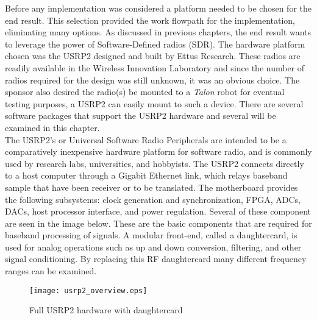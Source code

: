 Before any implementation was considered a platform needed to be chosen for the end result.  This selection provided the work flowpath for the implementation, eliminating many options.  As discussed in previous chapters, the end result wants to leverage the power of Software-Defined radios (SDR).  The hardware platform chosen was the USRP2 designed and built by Ettus Research\cite{USRP2Stats}.  These radios are readily available in the Wireless Innovation Laboratory and since the number of radios required for the design was still unknown, it was an obvious choice.  The sponsor also desired the radio(s) be mounted to a \textit{Talon} robot for eventual testing purposes, a USRP2 can easily mount to such a device.  There are several software packages that support the USRP2 hardware and several will be examined in this chapter.\\

The USRP2's or Universal Software Radio Peripherals are intended to be a comparatively inexpensive hardware platform for software radio, and is commonly used by research labs, universities, and hobbyists\cite{wired}.  The USRP2 connects directly to a host computer through a Gigabit Ethernet link, which relays baseband sample that have been receiver or to be translated.   The motherboard provides the following subsystems: clock generation and synchronization, FPGA, ADCs, DACs, host processor interface, and power regulation. Several of these component are seen in the image below.  These are the basic components that are required for baseband processing of signals. A modular front-end, called a daughtercard, is used for analog operations such as up and down conversion, filtering, and other signal conditioning. By replacing this RF daughtercard many different frequency ranges can be examined.\\

\begin{figure}\label{usrp2_full_hardware}
\centering
\texttt{[image: usrp2\_overview.eps]}
\caption{Full USRP2 hardware with daughtercard}
\end{figure}



